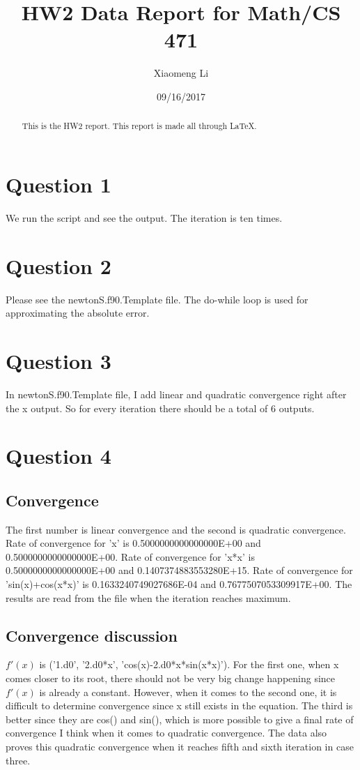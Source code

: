 \documentclass[12pt]{article}
\title{HW2 Data Report for Math/CS 471}
\author{Xiaomeng Li}
\date{09/16/2017}   %
\begin{document}
\maketitle

\begin{abstract}
This is the HW2 report. This report is made all through LaTeX.
\end{abstract}

\section{Question 1}
We run the script and see the output. The iteration is ten times.

\section{Question 2}
Please see the newtonS.f90.Template file. The do-while loop is used
for approximating the absolute error.

\section{Question 3}
In newtonS.f90.Template file, I add linear and quadratic convergence
right after the x output. So for every iteration there should be a
total of 6 outputs.

\section{Question 4}
\subsection{Convergence}
The first number is linear convergence and the second is quadratic
convergence.  
Rate of convergence for 'x' is 0.5000000000000000E+00 and
0.5000000000000000E+00.
Rate of convergence for 'x*x' is 0.5000000000000000E+00 and 
0.1407374883553280E+15. 
Rate of convergence for 'sin(x)+cos(x*x)' is 0.1633240749027686E-04 and
0.7677507053309917E+00.
The results are read from the file when the iteration reaches maximum.

\subsection{Convergence discussion}
$f'(x)$ is ('1.d0', '2.d0*x', 'cos(x)-2.d0*x*sin(x*x)'). 
For the first one, when x comes closer to its root, there should not
be very big change happening since $f'(x)$ is already a
constant. However, when it comes to the second one, it is difficult to
determine convergence since x still exists in the equation. The third
is better since they are cos() and sin(), which is more possible to give a
final rate of convergence I think when it comes to quadratic
convergence. The data also proves this quadratic convergence when it
reaches fifth and sixth iteration in case three.
\end{document}
